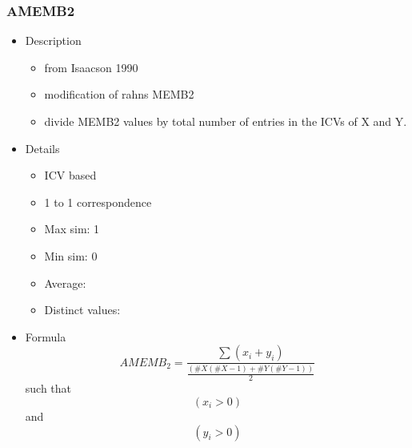 \documentclass{article}
\begin{document}
\subsubsection{AMEMB2}
\label{sec-6-5-1}
\begin{itemize}

\item Description
\label{sec-6-5-1-1}%
\begin{itemize}
\item from Isaacson 1990
\item modification of rahns MEMB2
\item divide MEMB2 values by total number of entries in the ICVs of X and
  Y.
\end{itemize}

\item Details
\label{sec-6-5-1-2}%
\begin{itemize}
\item ICV based
\item 1 to 1 correspondence
\item Max sim: 1
\item Min sim: 0
\item Average:
\item Distinct values:
\end{itemize}

\item Formula\\
\label{sec-6-5-1-3}%
$$ AMEMB_{2}=\frac{\sum \left( x_{i}+y_{i} \right)}{\frac{\left(\#X\left(\#X-1\right)+\#Y\left(\#Y-1\right)\right)}{2}} $$
such that $$ \left(x_{i}>0\right) $$ and $$ \left(y_{i}>0\right) $$
\end{itemize} %
\end{document}
